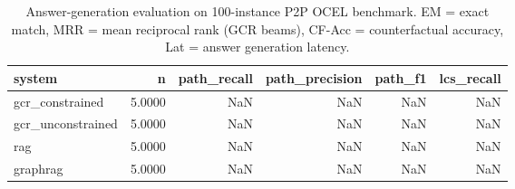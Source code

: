 \begin{table}
\caption{Answer-generation evaluation on 100-instance P2P OCEL benchmark. EM = exact match, MRR = mean reciprocal rank (GCR beams), CF-Acc = counterfactual accuracy, Lat = answer generation latency.}
\label{tab:answer_results}
\begin{tabular}{lrrrrr}
\toprule
system & n & path_recall & path_precision & path_f1 & lcs_recall \\
\midrule
gcr_constrained & 5.0000 & NaN & NaN & NaN & NaN \\
gcr_unconstrained & 5.0000 & NaN & NaN & NaN & NaN \\
rag & 5.0000 & NaN & NaN & NaN & NaN \\
graphrag & 5.0000 & NaN & NaN & NaN & NaN \\
\bottomrule
\end{tabular}
\end{table}
